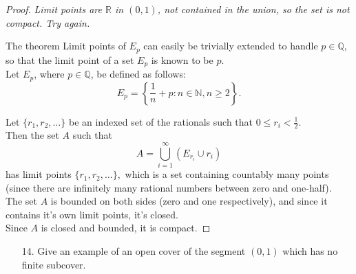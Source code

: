 \documentclass[10pt]{article}
\theoremstyle{definition}
\theoremstyle{plain}
\newcommand{\N}{\mathbb{N}}
\newcommand{\Q}{\mathbb{Q}}
\newcommand{\R}{\mathbb{R}}
\begin{document}
\begin{proof}
\textit{Limit points are $\R$ in $(0,1)$, not contained in the union, so the set is not compact. Try again.}

The theorem Limit points of $E_p$ can easily be trivially extended to handle $p\in\Q$, so that the limit point of a set $E_p$ is known to be $p$. \\

Let $E_p$, where $p\in\Q$, be defined as follows:
$$E_p = \left\{\frac{1}{n} + p: n\in\N, n\geq 2\right\}.$$

Let $\{r_1,r_2,\dots\}$ be an indexed set of the rationals such that $0\leq r_i<\frac{1}{2}$. \\

Then the set $A$ such that
$$A=\bigcup_{i=1}^\infty (E_{r_i} \cup {r_i})$$
has limit points $\{r_1,r_2,\dots\},$ which is a set containing countably many points (since there are infinitely many rational numbers between zero and one-half). \\

The set $A$ is bounded on both sides (zero and one respectively), and since it contains it's own limit points, it's closed.\\

Since $A$ is closed and bounded, it is compact.
\end{proof}





\pagebreak




\begin{enumerate}
\item[14.] Give an example of an open cover of the segment $(0,1)$ which has no finite subcover.
\end{enumerate}
\end{document}
